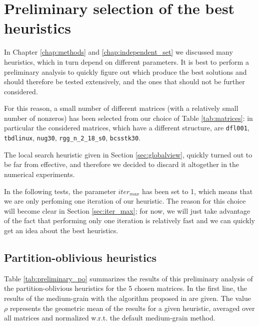 \section{Preliminary selection of the best heuristics} \label{sec:preliminary_tests}

In Chapter \ref{chap:methods} and \ref{chap:independent_set} we discussed many heuristics, which in turn depend on different parameters. It is best to perform a preliminary analysis to quickly figure out which produce the best solutions and should therefore be tested extensively, and the ones that should not be further considered.

For this reason, a small number of different matrices (with a relatively small number of nonzeros) has been selected from our choice of Table \ref{tab:matrices}: in particular the considered matrices, which have a different structure, are \verb|dfl001|, \verb|tbdlinux|, \verb|nug30|, \verb|rgg_n_2_18_s0|, \verb|bcsstk30|.

The local search heuristic given in Section \ref{sec:globalview}, quickly turned out to be far from effective, and therefore we decided to discard it altogether in the numerical experiments.

In the following tests, the parameter $iter_{max}$ has been set to 1, which means that we are only perfoming one iteration of our heuristic. The reason for this choice will become clear in Section \ref{sec:iter_max}; for now, we will just take advantage of the fact that performing only one iteration is relatively fast and we can quickly get an idea about the best heuristics.

\subsection{Partition-oblivious heuristics}

Table \ref{tab:preliminary_po} summarizes the results of this preliminary analysis of the partition-oblivious heuristics for the 5 chosen matrices. In the first line, the results of the medium-grain with the algorithm proposed in \cite{mediumgrain} are given. The value $\rho$ represents the geometric mean of the results for a given heuristic, averaged over all matrices and normalized w.r.t. the default medium-grain method.

